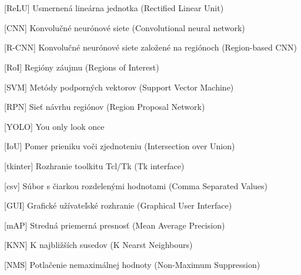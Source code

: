\cleardoublepage
\chapter*{\listofabbrevname}
{}

\begin{acronym}[KolikMista]

		[ReLU]
		{Usmernená lineárna jednotka (Rectified Linear Unit)}

		[CNN]
		{Konvolučné neurónové siete (Convolutional neural network)}

		[R-CNN]
		{Konvolučné neurónové siete založené na regiónoch (Region-based CNN)}

		[RoI]
		{Regióny záujmu (Regions of Interest)}

		[SVM]
		{Metódy podporných vektorov (Support Vector Machine)}

		[RPN]
		{Sieť návrhu regiónov (Region Proposal Network)}

		[YOLO]
		{You only look once}
	
		[IoU]
		{Pomer prieniku voči zjednoteniu (Intersection over Union)}
	
		[tkinter]
		{Rozhranie toolkitu Tcl/Tk (Tk interface)}

		[csv]
		{Súbor s čiarkou rozdelenými hodnotami (Comma Separated Values)}

		[GUI]
		{Grafické užívateľské rozhranie (Graphical User Interface)}

		[mAP]
		{Stredná priemerná presnosť (Mean Average Precision)}

		[KNN]
		{K najbližších susedov (K Nearst Neighbours)}

		[NMS]
		{Potlačenie nemaximálnej hodnoty (Non-Maximum Suppression)}




\end{acronym}
